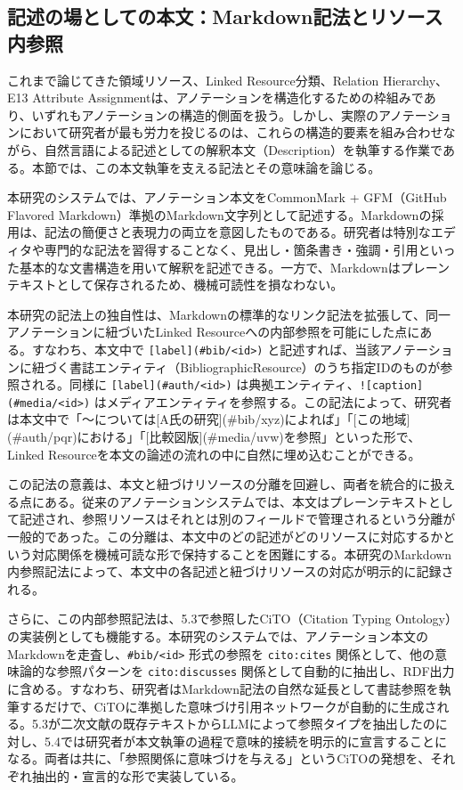 \subsection{記述の場としての本文：Markdown記法とリソース内参照}

これまで論じてきた領域リソース、Linked Resource分類、Relation Hierarchy、E13 Attribute Assignmentは、アノテーションを構造化するための枠組みであり、いずれもアノテーションの構造的側面を扱う。しかし、実際のアノテーションにおいて研究者が最も労力を投じるのは、これらの構造的要素を組み合わせながら、自然言語による記述としての解釈本文（Description）を執筆する作業である。本節では、この本文執筆を支える記法とその意味論を論じる。

本研究のシステムでは、アノテーション本文をCommonMark + GFM（GitHub Flavored Markdown）準拠のMarkdown文字列として記述する。Markdownの採用は、記法の簡便さと表現力の両立を意図したものである。研究者は特別なエディタや専門的な記法を習得することなく、見出し・箇条書き・強調・引用といった基本的な文書構造を用いて解釈を記述できる。一方で、Markdownはプレーンテキストとして保存されるため、機械可読性を損なわない。

本研究の記法上の独自性は、Markdownの標準的なリンク記法を拡張して、同一アノテーションに紐づいたLinked Resourceへの内部参照を可能にした点にある。すなわち、本文中で \texttt{[label](\#bib/<id>)} と記述すれば、当該アノテーションに紐づく書誌エンティティ（BibliographicResource）のうち指定IDのものが参照される。同様に \texttt{[label](\#auth/<id>)} は典拠エンティティ、\texttt{![caption](\#media/<id>)} はメディアエンティティを参照する。この記法によって、研究者は本文中で「〜については[A氏の研究](\#bib/xyz)によれば」「[この地域](\#auth/pqr)における」「[比較図版](\#media/uvw)を参照」といった形で、Linked Resourceを本文の論述の流れの中に自然に埋め込むことができる。

この記法の意義は、本文と紐づけリソースの分離を回避し、両者を統合的に扱える点にある。従来のアノテーションシステムでは、本文はプレーンテキストとして記述され、参照リソースはそれとは別のフィールドで管理されるという分離が一般的であった。この分離は、本文中のどの記述がどのリソースに対応するかという対応関係を機械可読な形で保持することを困難にする。本研究のMarkdown内参照記法によって、本文中の各記述と紐づけリソースの対応が明示的に記録される。

さらに、この内部参照記法は、5.3で参照したCiTO（Citation Typing Ontology）の実装例としても機能する。本研究のシステムでは、アノテーション本文のMarkdownを走査し、\texttt{\#bib/<id>} 形式の参照を \texttt{cito:cites} 関係として、他の意味論的な参照パターンを \texttt{cito:discusses} 関係として自動的に抽出し、RDF出力に含める。すなわち、研究者はMarkdown記法の自然な延長として書誌参照を執筆するだけで、CiTOに準拠した意味づけ引用ネットワークが自動的に生成される。5.3が二次文献の既存テキストからLLMによって参照タイプを抽出したのに対し、5.4では研究者が本文執筆の過程で意味的接続を明示的に宣言することになる。両者は共に、「参照関係に意味づけを与える」というCiTOの発想を、それぞれ抽出的・宣言的な形で実装している。

